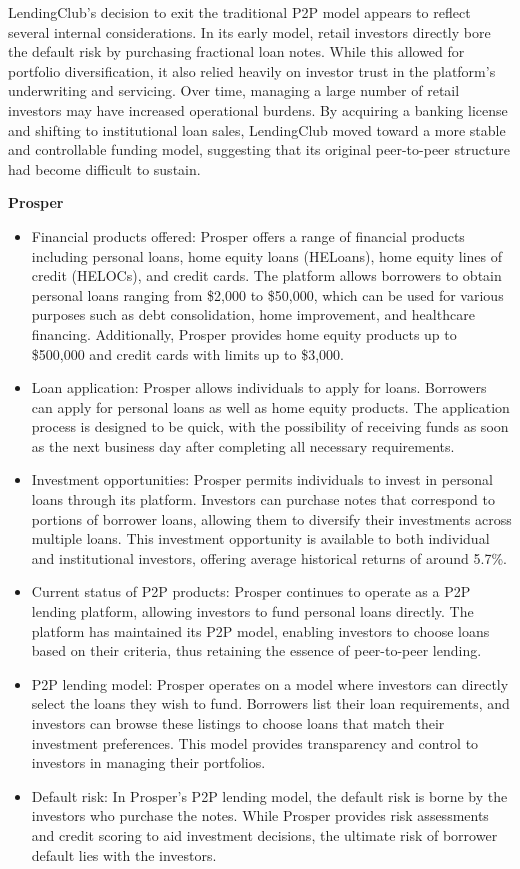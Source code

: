 \documentclass[pdflatex,sn-apa]{sn-jnl}%
\theoremstyle{thmstyleone}%
\theoremstyle{thmstyletwo}%
\theoremstyle{thmstylethree}%
\begin{document}
LendingClub’s decision to exit the traditional P2P model appears to reflect several internal considerations. In its early model, retail investors directly bore the default risk by purchasing fractional loan notes. While this allowed for portfolio diversification, it also relied heavily on investor trust in the platform’s underwriting and servicing. Over time, managing a large number of retail investors may have increased operational burdens. By acquiring a banking license and shifting to institutional loan sales, LendingClub moved toward a more stable and controllable funding model, suggesting that its original peer-to-peer structure had become difficult to sustain.

\vspace{1\baselineskip}
\textbf{Prosper}
\begin{itemize} 
\item Financial products offered: Prosper offers a range of financial products including personal loans, home equity loans (HELoans), home equity lines of credit (HELOCs), and credit cards. The platform allows borrowers to obtain personal loans ranging from \$2,000 to \$50,000, which can be used for various purposes such as debt consolidation, home improvement, and healthcare financing. Additionally, Prosper provides home equity products up to \$500,000 and credit cards with limits up to \$3,000.
\item Loan application: Prosper allows individuals to apply for loans. Borrowers can apply for personal loans as well as home equity products. The application process is designed to be quick, with the possibility of receiving funds as soon as the next business day after completing all necessary requirements.
\item Investment opportunities: Prosper permits individuals to invest in personal loans through its platform. Investors can purchase notes that correspond to portions of borrower loans, allowing them to diversify their investments across multiple loans. This investment opportunity is available to both individual and institutional investors, offering average historical returns of around 5.7\%.
\item Current status of P2P products: Prosper continues to operate as a P2P lending platform, allowing investors to fund personal loans directly. The platform has maintained its P2P model, enabling investors to choose loans based on their criteria, thus retaining the essence of peer-to-peer lending.
\item P2P lending model: Prosper operates on a model where investors can directly select the loans they wish to fund. Borrowers list their loan requirements, and investors can browse these listings to choose loans that match their investment preferences. This model provides transparency and control to investors in managing their portfolios.
\item Default risk: In Prosper’s P2P lending model, the default risk is borne by the investors who purchase the notes. While Prosper provides risk assessments and credit scoring to aid investment decisions, the ultimate risk of borrower default lies with the investors.
\end{itemize}
\end{document}
